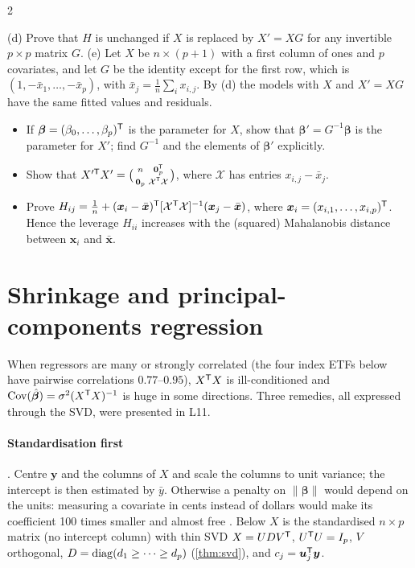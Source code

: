 \begin{paracol}{2}
\begin{exercise}\label{ch05:ex-ps3-1de}
(d) Prove that $H$ is unchanged if $X$ is replaced by $X'=XG$ for any invertible $p\times p$ matrix $G$.
(e) Let $X$ be $n\times(p+1)$ with a first column of ones and $p$ covariates, and let $G$ be the identity except for the first
row, which is $(1,-\bar x_1,\dots,-\bar x_p)$, with $\bar x_j=\frac1n\sum_ix_{i,j}$. By (d) the models with $X$ and $X'=XG$ have the
same fitted values and residuals.
\begin{itemize}
  \item If $\bm\beta=(\beta_0,\dots,\beta_p)^{\mathsf T}$ is the parameter for $X$, show that $\bm\beta'=G^{-1}\bm\beta$ is the parameter for $X'$; find
        $G^{-1}$ and the elements of $\bm\beta'$ explicitly.
  \item Show that $X'^{\mathsf T}X'=\bigl(\begin{smallmatrix}n&\bm 0_p^{\mathsf T}\\ \bm 0_p&\mathcal X^{\mathsf T}\mathcal X\end{smallmatrix}\bigr)$, where $\mathcal X$ has entries $x_{i,j}-\bar x_j$.
  \item Prove $H_{ij}=\frac1n+(\bm x_i-\bar{\bm x})^{\mathsf T}[\mathcal X^{\mathsf T}\mathcal X]^{-1}(\bm x_j-\bar{\bm x})$, where $\bm x_i=(x_{i,1},\dots,x_{i,p})^{\mathsf T}$. Hence the
        leverage $H_{ii}$ increases with the (squared) Mahalanobis distance between $\bm x_i$ and $\bar{\bm x}$.
\end{itemize}
\end{exercise}

\section{Shrinkage and principal-components regression}\label{ch05:sec-shrink}
When regressors are many or strongly correlated (the four index ETFs below have pairwise correlations
$0.77$--$0.95$), $X^{\mathsf T} X$ is ill-conditioned and $\operatorname{Cov}(\hat{\bm\beta})=\sigma^2(X^{\mathsf T} X)^{-1}$ is huge in some directions. Three
remedies, all expressed through the SVD, were presented in L11.

\paragraph{Standardisation first} . Centre $\bm y$ and the columns of $X$ and scale the columns to unit
variance; the intercept is then estimated by $\bar y$. Otherwise a penalty on $\|\bm\beta\|$ would depend on the units:
measuring a covariate in cents instead of dollars would make its coefficient 100 times smaller and almost free
. Below $X$ is the standardised $n\times p$ matrix (no intercept column) with thin SVD
$X=UDV^{\mathsf T}$, $U^{\mathsf T} U=I_p$, $V$ orthogonal, $D=\operatorname{diag}(d_1\ge\dots\ge d_p)$ (\cref{thm:svd}), and $c_j=\bm u_j^{\mathsf T}\bm y$.


\end{paracol}
